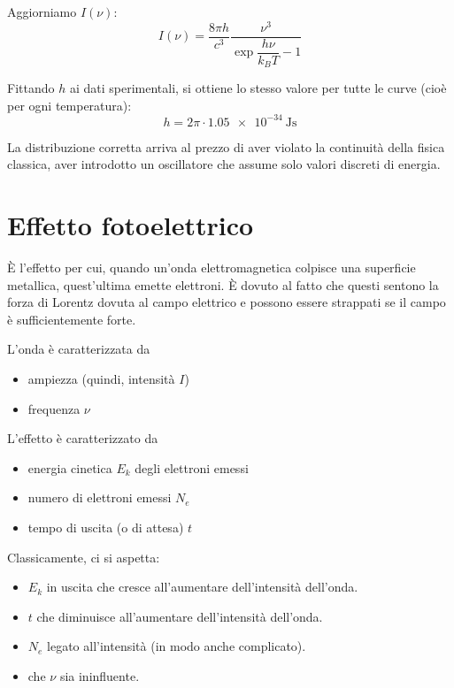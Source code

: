 Aggiorniamo $I(\nu)$:
\begin{equation}
    I(\nu) = \frac{8\pi h}{c^3} \frac{\nu^3}{\exp{\dfrac{h \nu}{k_B T}} - 1}
\end{equation}

Fittando $h$ ai dati sperimentali, si ottiene lo stesso valore per tutte le curve (cioè per ogni temperatura):
\begin{equation}
    h = 2\pi \cdot \qty{1.05e-34}{\joule\second}
\end{equation}

La distribuzione corretta arriva al prezzo di aver violato la continuità della fisica classica, aver introdotto un oscillatore che assume solo valori discreti di energia.



\section{Effetto fotoelettrico}

È l'effetto per cui, quando un'onda elettromagnetica colpisce una superficie metallica, quest'ultima emette elettroni.
È dovuto al fatto che questi sentono la forza di Lorentz dovuta al campo elettrico e possono essere strappati se il campo è sufficientemente forte.

L'onda è caratterizzata da
\begin{itemize}
    \item ampiezza (quindi, intensità $I$)
    \item frequenza $\nu$
\end{itemize}

L'effetto è caratterizzato da
\begin{itemize}
    \item energia cinetica $E_k$ degli elettroni emessi
    \item numero di elettroni emessi $N_e$
    \item tempo di uscita (o di attesa) $t$
\end{itemize}

Classicamente, ci si aspetta:
\begin{itemize}
    \item $E_k$ in uscita che cresce all'aumentare dell'intensità dell'onda.
    \item $t$ che diminuisce all'aumentare dell'intensità dell'onda.
    \item $N_e$ legato all'intensità (in modo anche complicato).
    \item che $\nu$ sia ininfluente.
\end{itemize}

